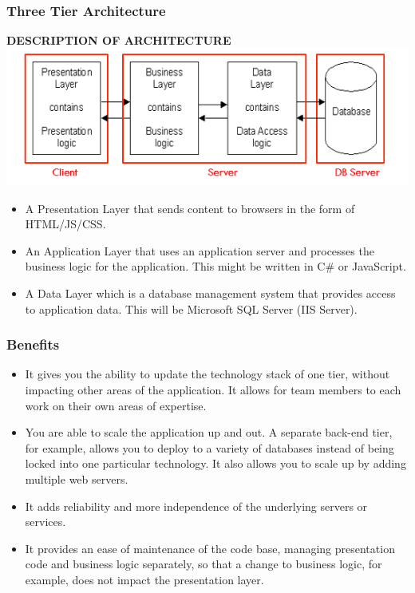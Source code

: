 \documentclass{article}
\begin{document}
\subsubsection{Three Tier Architecture}
\textbf{DESCRIPTION OF ARCHITECTURE} \\
\includegraphics[scale=1]{Capture2.png} 
\begin{itemize}
\item A Presentation Layer that sends content to browsers in the form of HTML/JS/CSS. 
\item An Application Layer that uses an application server and processes the business logic for the application. This might be written in C\# or JavaScript.
\item A Data Layer which is a database management system that provides access to application data. This will be Microsoft SQL Server (IIS Server). \\
\end{itemize}
\subsubsection{Benefits}
\begin{itemize}
\item It gives you the ability to update the technology stack of one tier, without impacting other areas of the application.
It allows for team members to each work on their own areas of expertise.
\item You are able to scale the application up and out. A separate back-end tier, for example, allows you to deploy to a variety of databases instead of being locked into one particular technology. It also allows you to scale up by adding multiple web servers.
\item It adds reliability and more independence of the underlying servers or services.
\item It provides an ease of maintenance of the code base, managing presentation code and business logic separately, so that a change to business logic, for example, does not impact the presentation layer. \cite{tier}
\end{itemize}
\end{document}
